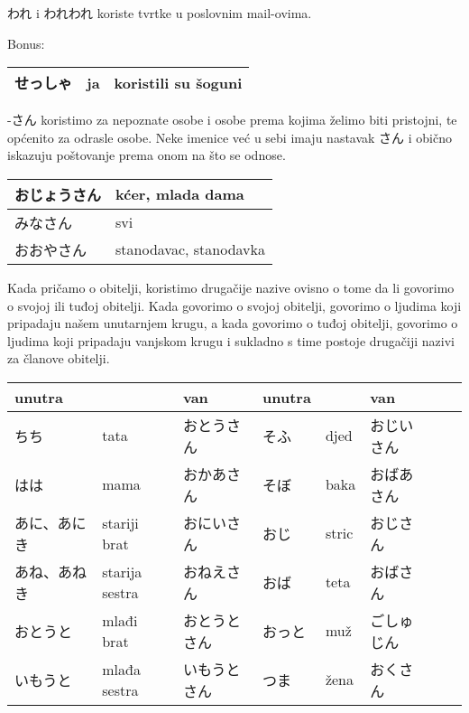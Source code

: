 	
	われ i われわれ koriste tvrtke u poslovnim mail-ovima.\newline
	
	
	Bonus:
	\begin{tabular}{|l|l|l|}
		\hline
		せっしゃ&ja&koristili su šoguni\\\hline
	\end{tabular}
	
	\newpage
	

	\ten {}

	-さん	koristimo za nepoznate osobe i osobe prema kojima želimo biti pristojni, te općenito za odrasle osobe. Neke imenice već u sebi imaju nastavak さん i obično iskazuju poštovanje prema onom na što se odnose.
	
	\begin{table}[!h]	
	\begin{tabular}{|l|l|}
		\hline
		おじょうさん&kćer, mlada dama\\\hline
		みなさん&svi\\\hline
		おおやさん&stanodavac, stanodavka\\\hline

	\end{tabular}
	\end{table}
	
	Kada pričamo o obitelji, koristimo drugačije nazive ovisno o tome da li govorimo o svojoj ili tuđoj obitelji. Kada govorimo o svojoj obitelji, govorimo o ljudima koji pripadaju našem unutarnjem krugu, a kada govorimo o tuđoj obitelji, govorimo o ljudima koji pripadaju vanjskom krugu i sukladno s time postoje drugačiji nazivi za članove obitelji.
	
	\begin{table}[!h]
	\begin{tabular}{|l|l|l||l|l|l|l|l|}
		\hline
		unutra& &van&unutra& &van\\\hline
		ちち&tata&おとうさん&そふ&djed&おじいさん\\\hline
		はは&mama&おかあさん&そぼ&baka&おばあさん\\\hline
		あに、あにき&stariji brat&おにいさん&おじ&stric&おじさん\\\hline
		あね、あねき&starija sestra&おねえさん&おば&teta&おばさん\\\hline
		おとうと&mlađi brat&おとうとさん&おっと&muž&ごしゅじん\\\hline
		いもうと&mlađa sestra&いもうとさん&つま&žena&おくさん\\\hline
	\end{tabular}
	\end{table}
	
